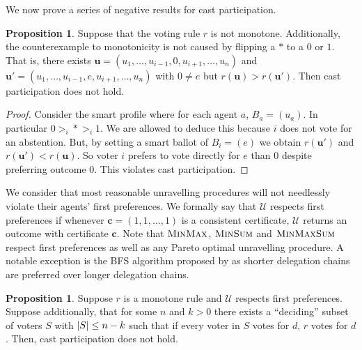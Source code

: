\documentclass[11pt,a4paper, titlepage]{article}
\DeclarePairedDelimiter\abs{\lvert}{\rvert}
\theoremstyle{definition}
\newtheorem{proposition}[theorem]{Proposition}
\let\vec\mathbf
\begin{document}
We now prove a series of negative results for cast participation.



\begin{proposition} Suppose that the voting rule $r$ is not monotone. Additionally, the counterexample to monotonicity is not caused by flipping a $*$ to a $0$ or $1$. 
That is, there exists $\vec{u} = (u_1, \ldots, u_{i-1}, 0, u_{i+1}, \ldots, u_n)$ and $\vec{u}' = (u_1, \ldots, u_{i-1}, e, u_{i+1}, \ldots, u_n)$ with $0 \neq e$ but $r(\vec{u}) > r(\vec{u}')$. 
Then cast participation does not hold.
\end{proposition}

\begin{proof}
    Consider the smart profile where for each agent $a$, $B_a = (u_a)$. 
    In particular $0 >_i * >_i 1$. We are allowed to deduce this because $i$ does not vote for an abstention.
    But, by setting a smart ballot of $B_i = (e)$ we obtain $r(\vec{u}')$ and $ r(\vec{u}') < r(\vec{u})$. So voter $i$ prefers to vote directly for $e$ than $0$ despite preferring outcome $0$.
    This violates cast participation.
\end{proof}

We consider that most reasonable unravelling procedures will not needlessly violate their agents' first preferences. 
We formally say that $\mathcal{U}$ respects first preferences if whenever $\vec{c} = (1, 1, \ldots, 1)$ is a consistent certificate, $\mathcal{U}$ returns an outcome with certificate $\vec{c}$. 
Note that $\textsc{MinMax}$, $\textsc{MinSum}$ and $\textsc{MinMaxSum}$ respect first preferences as well as any Pareto optimal unravelling procedure. A notable exception is the BFS algorithm proposed by \citeauthor{kotsialou} as shorter delegation chains are preferred over longer delegation chains.

\begin{proposition}
    Suppose $r$ is a monotone rule and $\mathcal{U}$ respects first preferences. Suppose additionally, that for some $n$ and $k > 0$ there exists a ``deciding'' subset of voters $S$ with $\abs{S} \leq n - k$ such that if every voter in $S$ votes for $d$, $r$ votes for $d$.
    Then, cast participation does not hold.
\end{proposition}
\end{document}
